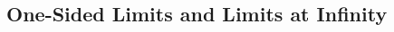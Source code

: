 \documentclass[8pt,landscape]{article}
\begin{document}
\begin{multicols}{3}




    \subsection{One-Sided Limits and Limits at Infinity}


\end{multicols}
\end{document}
